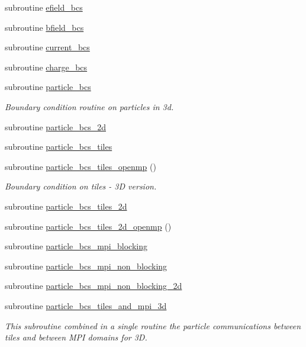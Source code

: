 \begin{DoxyCompactItemize}
\item 
subroutine \hyperlink{namespaceboundary_a2397a80ea9511ae3266ad16c668cc547}{efield\+\_\+bcs}
\item 
subroutine \hyperlink{namespaceboundary_af2316f12b3b85debc7214c4c47035322}{bfield\+\_\+bcs}
\item 
subroutine \hyperlink{namespaceboundary_a2bd382bbf256b1208d4fd3721c37ad08}{current\+\_\+bcs}
\item 
subroutine \hyperlink{namespaceboundary_a0b6d77029b51dd2a0e853c265885ab6c}{charge\+\_\+bcs}
\item 
subroutine \hyperlink{namespaceboundary_a9e7ba00d025d595683607b3ccd95bcb3}{particle\+\_\+bcs}
\begin{DoxyCompactList}\small\item\em Boundary condition routine on particles in 3d. \end{DoxyCompactList}\item 
subroutine \hyperlink{namespaceboundary_aad89819169dca0b0ae8cf04748a86fb1}{particle\+\_\+bcs\+\_\+2d}
\item 
subroutine \hyperlink{namespaceboundary_added6cf2ea0ffc7ab618c3d9af16fade}{particle\+\_\+bcs\+\_\+tiles}
\item 
subroutine \hyperlink{namespaceboundary_af6d7a140eef6818609e44869b67cd3a7}{particle\+\_\+bcs\+\_\+tiles\+\_\+openmp} ()
\begin{DoxyCompactList}\small\item\em Boundary condition on tiles -\/ 3D version. \end{DoxyCompactList}\item 
subroutine \hyperlink{namespaceboundary_afb4e6ab09e288dab2bb9ce2d731e276f}{particle\+\_\+bcs\+\_\+tiles\+\_\+2d}
\item 
subroutine \hyperlink{namespaceboundary_a9f9517df19ef503bb2a69e63aeec91d4}{particle\+\_\+bcs\+\_\+tiles\+\_\+2d\+\_\+openmp} ()
\item 
subroutine \hyperlink{namespaceboundary_a1789d63402ac897697791a2fca4fa8e6}{particle\+\_\+bcs\+\_\+mpi\+\_\+blocking}
\item 
subroutine \hyperlink{namespaceboundary_aac32f7f65f1998963706f9d5776d29d2}{particle\+\_\+bcs\+\_\+mpi\+\_\+non\+\_\+blocking}
\item 
subroutine \hyperlink{namespaceboundary_a3293856926030dfea9e8ca05c61e1a5a}{particle\+\_\+bcs\+\_\+mpi\+\_\+non\+\_\+blocking\+\_\+2d}
\item 
subroutine \hyperlink{namespaceboundary_ac117306978e83b787afba90c3ac038f4}{particle\+\_\+bcs\+\_\+tiles\+\_\+and\+\_\+mpi\+\_\+3d}
\begin{DoxyCompactList}\small\item\em This subroutine combined in a single routine the particle communications between tiles and between M\+PI domains for 3D. \end{DoxyCompactList}\end{DoxyCompactItemize}


